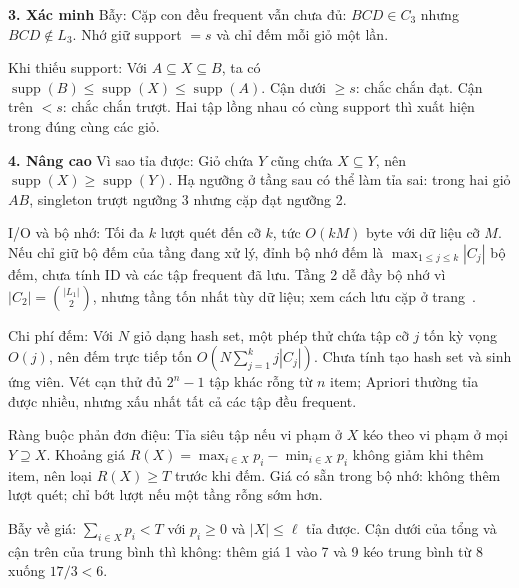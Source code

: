 \documentclass[10pt,a4paper,twocolumn]{article}
\newcommand{\key}[1]{#1:\enspace}
\newcommand{\unitheading}[2]{%
  \par\addvspace{1pt}\noindent\textbf{#1. #2}\enspace}
\newcommand{\unitverification}{\unitheading{3}{Xác minh}}
\newcommand{\unitadvanced}{\unitheading{4}{Nâng cao}}
\begin{document}

\unitverification
\key{Bẫy} Cặp con đều frequent vẫn chưa đủ: $BCD\in C_3$ nhưng $BCD\notin L_3$. Nhớ giữ support $=s$ và chỉ đếm mỗi giỏ một lần.

\key{Khi thiếu support} Với $A\subseteq X\subseteq B$, ta có $\operatorname{supp}(B)\le\operatorname{supp}(X)\le\operatorname{supp}(A)$. Cận dưới $\ge s$: chắc chắn đạt. Cận trên $<s$: chắc chắn trượt. Hai tập lồng nhau có cùng support thì xuất hiện trong đúng cùng các giỏ.

\unitadvanced
\key{Vì sao tỉa được} Giỏ chứa $Y$ cũng chứa $X\subseteq Y$, nên $\operatorname{supp}(X)\ge\operatorname{supp}(Y)$. Hạ ngưỡng ở tầng sau có thể làm tỉa sai: trong hai giỏ $AB$, singleton trượt ngưỡng 3 nhưng cặp đạt ngưỡng 2.

\key{I/O và bộ nhớ} Tối đa $k$ lượt quét đến cỡ $k$, tức $O(kM)$ byte với dữ liệu cỡ $M$. Nếu chỉ giữ bộ đếm của tầng đang xử lý, đỉnh bộ nhớ đếm là $\max_{1\le j\le k}|C_j|$ bộ đếm, chưa tính ID và các tập frequent đã lưu. Tầng 2 dễ đầy bộ nhớ vì $|C_2|=\binom{|L_1|}{2}$, nhưng tầng tốn nhất tùy dữ liệu; xem cách lưu cặp ở trang~\pageref*{topic:pairs}.

\key{Chi phí đếm} Với $N$ giỏ dạng hash set, một phép thử chứa tập cỡ $j$ tốn kỳ vọng $O(j)$, nên đếm trực tiếp tốn $O(N\sum_{j=1}^k j|C_j|)$. Chưa tính tạo hash set và sinh ứng viên. Vét cạn thử đủ $2^n-1$ tập khác rỗng từ $n$ item; Apriori thường tỉa được nhiều, nhưng xấu nhất tất cả các tập đều frequent.

\key{Ràng buộc phản đơn điệu} Tỉa siêu tập nếu vi phạm ở $X$ kéo theo vi phạm ở mọi $Y\supseteq X$. Khoảng giá $R(X)=\max_{i\in X}p_i-\min_{i\in X}p_i$ không giảm khi thêm item, nên loại $R(X)\ge T$ trước khi đếm. Giá có sẵn trong bộ nhớ: không thêm lượt quét; chỉ bớt lượt nếu một tầng rỗng sớm hơn.

\key{Bẫy về giá} $\sum_{i\in X}p_i<T$ với $p_i\ge0$ và $|X|\le \ell$ tỉa được. Cận dưới của tổng và cận trên của trung bình thì không: thêm giá 1 vào 7 và 9 kéo trung bình từ 8 xuống $17/3<6$.
\end{document}
